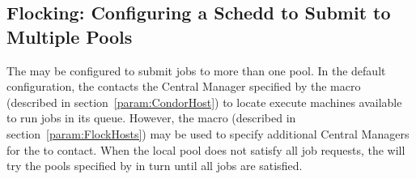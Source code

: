 \subsection{\label{sec:Flocking}
Flocking: Configuring a Schedd to Submit to Multiple Pools}

The  may be configured to submit jobs to more than one
pool.
In the default configuration, the  contacts the
Central Manager specified by the  macro (described
in section~\ref{param:CondorHost}) to locate execute machines
available to run jobs in its queue.
However, the
 macro (described in
section~\ref{param:FlockHosts}) may be used to specify additional
Central Managers for the  to contact.
When the local
pool does not satisfy all job requests, the  will try
the pools specified by  in turn until all jobs are
satisfied.